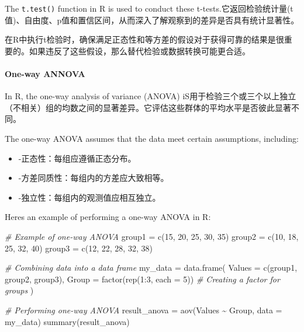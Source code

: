 \documentclass[
]{article}
\newenvironment{Shaded}{}{}
\newcommand{\AttributeTok}[1]{\textcolor[rgb]{0.49,0.56,0.16}{#1}}
\newcommand{\CommentTok}[1]{\textcolor[rgb]{0.38,0.63,0.69}{\textit{#1}}}
\newcommand{\DecValTok}[1]{\textcolor[rgb]{0.25,0.63,0.44}{#1}}
\newcommand{\FunctionTok}[1]{\textcolor[rgb]{0.02,0.16,0.49}{#1}}
\newcommand{\NormalTok}[1]{#1}
\newcommand{\OtherTok}[1]{\textcolor[rgb]{0.00,0.44,0.13}{#1}}
\newcommand{\SpecialCharTok}[1]{\textcolor[rgb]{0.25,0.44,0.63}{#1}}
\begin{document}
The \texttt{t.test()} function in R is used to conduct these
t-tests.它返回检验统计量(t值)、自由度、p值和置信区间，从而深入了解观察到的差异是否具有统计显著性。

在R中执行t检验时，确保满足正态性和等方差的假设对于获得可靠的结果是很重要的。如果违反了这些假设，那么替代检验或数据转换可能更合适。

\hypertarget{one-way-annova}{%
\paragraph{One-way ANNOVA}\label{one-way-annova}}

In R, the one-way analysis of variance (ANOVA)
iS用于检验三个或三个以上独立（不相关）组的均数之间的显著差异。它评估这些群体的平均水平是否彼此显著不同。

The one-way ANOVA assumes that the data meet certain assumptions,
including:

\begin{itemize}
\item
  -正态性：每组应遵循正态分布。
\item
  -方差同质性：每组内的方差应大致相等。
\item
  -独立性：每组内的观测值应相互独立。
\end{itemize}

Here\textquotesingle s an example of performing a one-way ANOVA in R:

\begin{Shaded}
\begin{Highlighting}[]
\CommentTok{\# Example of one{-}way ANOVA}
\NormalTok{group1 }\OtherTok{=} \FunctionTok{c}\NormalTok{(}\DecValTok{15}\NormalTok{, }\DecValTok{20}\NormalTok{, }\DecValTok{25}\NormalTok{, }\DecValTok{30}\NormalTok{, }\DecValTok{35}\NormalTok{)}
\NormalTok{group2 }\OtherTok{=} \FunctionTok{c}\NormalTok{(}\DecValTok{10}\NormalTok{, }\DecValTok{18}\NormalTok{, }\DecValTok{25}\NormalTok{, }\DecValTok{32}\NormalTok{, }\DecValTok{40}\NormalTok{)}
\NormalTok{group3 }\OtherTok{=} \FunctionTok{c}\NormalTok{(}\DecValTok{12}\NormalTok{, }\DecValTok{22}\NormalTok{, }\DecValTok{28}\NormalTok{, }\DecValTok{32}\NormalTok{, }\DecValTok{38}\NormalTok{)}

\CommentTok{\# Combining data into a data frame}
\NormalTok{my\_data }\OtherTok{=} \FunctionTok{data.frame}\NormalTok{(}
  \AttributeTok{Values =} \FunctionTok{c}\NormalTok{(group1, group2, group3),}
  \AttributeTok{Group =} \FunctionTok{factor}\NormalTok{(}\FunctionTok{rep}\NormalTok{(}\DecValTok{1}\SpecialCharTok{:}\DecValTok{3}\NormalTok{, }\AttributeTok{each =} \DecValTok{5}\NormalTok{))  }\CommentTok{\# Creating a factor for groups}
\NormalTok{)}

\CommentTok{\# Performing one{-}way ANOVA}
\NormalTok{result\_anova }\OtherTok{=} \FunctionTok{aov}\NormalTok{(Values }\SpecialCharTok{\textasciitilde{}}\NormalTok{ Group, }\AttributeTok{data =}\NormalTok{ my\_data)}
\FunctionTok{summary}\NormalTok{(result\_anova)}
\end{Highlighting}
\end{Shaded}
\end{document}
